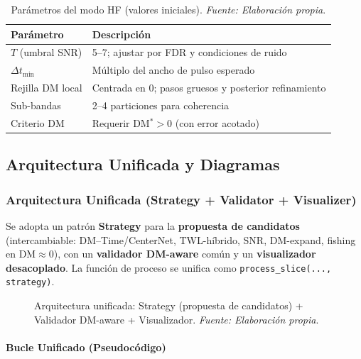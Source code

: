 \begin{table}[H]
  \centering
  \caption{Parámetros del modo HF (valores iniciales). \textit{Fuente: Elaboración propia}.}
  \label{tab:param_hf}
  \begin{tabular}{|l|l|}
    \toprule
    \textbf{Parámetro} & \textbf{Descripción} \\
    \midrule
    $T$ (umbral SNR) & 5--7; ajustar por FDR y condiciones de ruido \\
    $\Delta t_{\min}$ & Múltiplo del ancho de pulso esperado \\
    Rejilla DM local & Centrada en 0; pasos gruesos y posterior refinamiento \\
    Sub-bandas & 2--4 particiones para coherencia \\
    Criterio DM & Requerir DM$^\ast>0$ (con error acotado) \\
    \bottomrule
  \end{tabular}
\end{table}

\subsection{Arquitectura Unificada y Diagramas}

\subsubsection{Arquitectura Unificada (Strategy + Validator + Visualizer)}

Se adopta un patrón \textbf{Strategy} para la \textbf{propuesta de candidatos} (intercambiable: DM--Time/CenterNet, TWL-híbrido, SNR, DM-expand, fishing en DM$\approx0$), con un \textbf{validador DM-aware} común y un \textbf{visualizador desacoplado}. La función de proceso se unifica como \texttt{process\_slice(..., strategy)}.

\begin{figure}[H] 
\centering 
\caption{Arquitectura unificada: Strategy (propuesta de candidatos) + Validador DM-aware + Visualizador. \textit{Fuente: Elaboración propia}.}
\label{fig:arquitectura-unificada} 
\end{figure}

\paragraph{Bucle Unificado (Pseudocódigo)}

